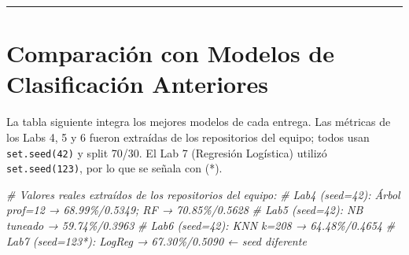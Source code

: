 \documentclass[
]{article}
\newenvironment{Shaded}{\begin{snugshade}}{\end{snugshade}}
\newcommand{\CommentTok}[1]{\textcolor[rgb]{0.56,0.35,0.01}{\textit{#1}}}
\begin{document}
\begin{center}\rule{0.5\linewidth}{0.5pt}\end{center}

\section{Comparación con Modelos de Clasificación
Anteriores}\label{comparaciuxf3n-con-modelos-de-clasificaciuxf3n-anteriores}

La tabla siguiente integra los mejores modelos de cada entrega. Las
métricas de los Labs 4, 5 y 6 fueron extraídas de los repositorios del
equipo; todos usan \texttt{set.seed(42)} y split 70/30. El Lab 7
(Regresión Logística) utilizó \texttt{set.seed(123)}, por lo que se
señala con (*).

\begin{Shaded}
\begin{Highlighting}[]
\CommentTok{\# Valores reales extraídos de los repositorios del equipo:}
\CommentTok{\# Lab4 (seed=42): Árbol prof=12 → 68.99\%/0.5349; RF → 70.85\%/0.5628}
\CommentTok{\# Lab5 (seed=42): NB tuneado   → 59.74\%/0.3963}
\CommentTok{\# Lab6 (seed=42): KNN k=208    → 64.48\%/0.4654}
\CommentTok{\# Lab7 (seed=123*): LogReg     → 67.30\%/0.5090  ← seed diferente}


\end{Highlighting}
\end{Shaded}
\end{document}
